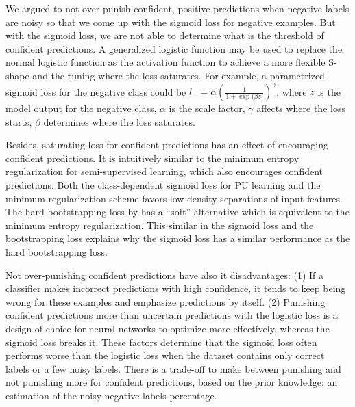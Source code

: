 We argued to not over-punish confident, positive predictions when negative labels are noisy so that we come up with the sigmoid loss for negative examples.
But with the sigmoid loss, we are not able to determine what is the threshold of confident predictions.
A generalized logistic function may be used to replace the normal logistic function as the activation function to achieve a more flexible S-shape and the tuning where the loss saturates.
For example, a parametrized sigmoid loss for the negative class could be $l_{-} = \alpha (\frac{1}{1+\exp{(\beta z_)}})^{\gamma}$, where $z$ is the model output for the negative class, $\alpha$ is the scale factor, $\gamma$ affects where the loss starts, $\beta$ determines where the loss saturates.

Besides, saturating loss for confident predictions has an effect of encouraging confident predictions.
It is intuitively similar to the minimum entropy regularization for semi-supervised learning, which also encourages confident predictions.
Both the class-dependent sigmoid loss for PU learning and the minimum regularization scheme favors low-density separations of input features.
The hard bootstrapping loss by \cite{reed2014training} has a ``soft'' alternative which is equivalent to the minimum entropy regularization.
This similar in the sigmoid loss and the bootstrapping loss explains why the sigmoid loss has a similar performance as the hard bootstrapping loss.

Not over-punishing confident predictions have also it disadvantages:
(1) If a classifier makes incorrect predictions with high confidence, it tends to keep being wrong for these examples and emphasize predictions by itself.
(2) Punishing confident predictions more than uncertain predictions with the logistic loss is a design of choice for neural networks to optimize more effectively, whereas the sigmoid loss breaks it.
These factors determine that the sigmoid loss often performs worse than the logistic loss when the dataset contains only correct labels or a few noisy labels.
There is a trade-off to make between punishing and not punishing more for confident predictions, based on the prior knowledge: an estimation of the noisy negative labels percentage.


